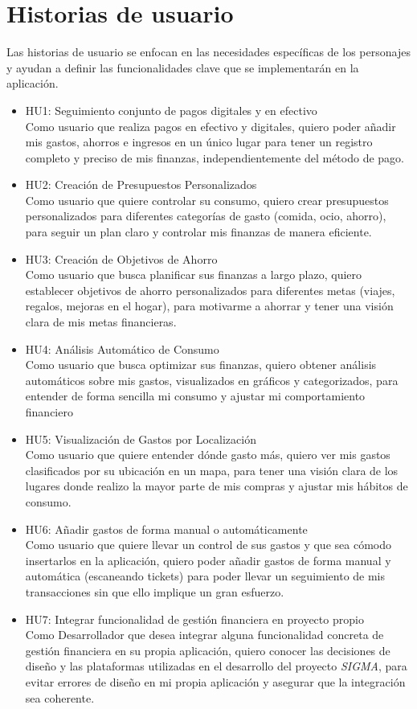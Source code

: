 \section{Historias de usuario}
Las historias de usuario se enfocan en las necesidades específicas de los personajes y ayudan a definir las funcionalidades clave que se implementarán en la aplicación.

\begin{itemize}
    \item HU1: Seguimiento conjunto de pagos digitales y en efectivo\\
    Como usuario que realiza pagos en efectivo y digitales,
    quiero poder añadir mis gastos, ahorros e ingresos en un único lugar
    para tener un registro completo y preciso de mis finanzas, independientemente del método de pago.
    \item HU2: Creación de Presupuestos Personalizados\\
    Como usuario que quiere controlar su consumo,
    quiero crear presupuestos personalizados para diferentes categorías de gasto (comida, ocio, ahorro),
    para seguir un plan claro y controlar mis finanzas de manera eficiente.
    \item HU3: Creación de Objetivos de Ahorro\\
    Como usuario que busca planificar sus finanzas a largo plazo,
    quiero establecer objetivos de ahorro personalizados para diferentes metas (viajes, regalos, mejoras en el hogar),
    para motivarme a ahorrar y tener una visión clara de mis metas financieras.
    \item HU4: Análisis Automático de Consumo\\
    Como usuario que busca optimizar sus finanzas,
    quiero obtener análisis automáticos sobre mis gastos, visualizados en gráficos y categorizados,
    para entender de forma sencilla mi consumo y ajustar mi comportamiento financiero
    \item HU5: Visualización de Gastos por Localización\\
    Como usuario que quiere entender dónde gasto más,
    quiero ver mis gastos clasificados por su ubicación en un mapa,
    para tener una visión clara de los lugares donde realizo la mayor parte de mis compras y ajustar mis hábitos de consumo.
    \item HU6: Añadir gastos de forma manual o automáticamente\\ 
    Como usuario que quiere llevar un control de sus gastos y que sea cómodo insertarlos en la aplicación, quiero poder añadir gastos de forma manual y automática (escaneando tickets) para poder llevar un seguimiento de mis transacciones sin que ello implique un gran esfuerzo.
    \item HU7: Integrar funcionalidad de gestión financiera en proyecto propio\\
    Como Desarrollador que desea integrar alguna funcionalidad concreta de gestión financiera en su propia aplicación, quiero conocer las decisiones de diseño y las plataformas utilizadas en el desarrollo del proyecto \textit{SIGMA}, para evitar errores de diseño en mi propia aplicación y asegurar que la integración sea coherente.
    

\end{itemize}
